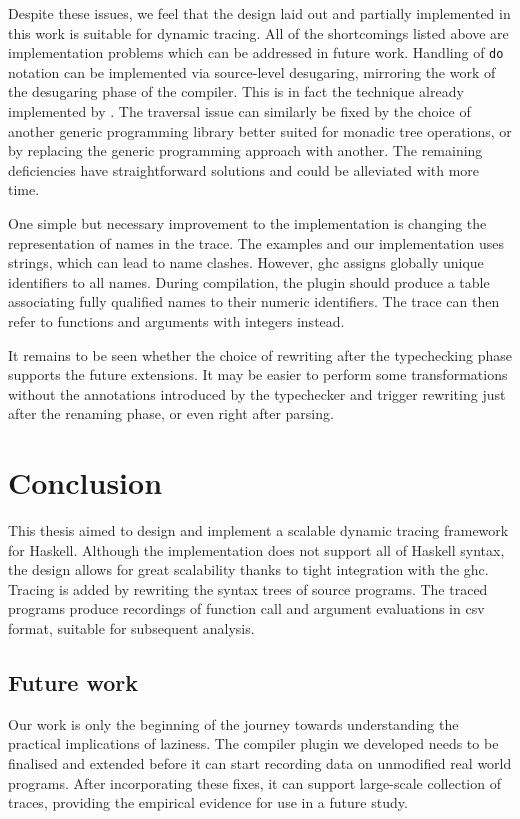 \documentclass[thesis=B,english]{FITthesis}[2019/12/23]
\newcommand{\hsCode}[1]{\texttt{#1}}
\begin{document}
Despite these issues, we feel that the design laid out and partially
implemented in this work is suitable for dynamic tracing. All of the
shortcomings listed above are implementation problems which can be addressed in
future work. Handling of \hsCode{do} notation can be implemented via
source-level desugaring, mirroring the work of the desugaring phase of the
compiler. This is in fact the technique already implemented by
. The traversal issue can similarly be fixed by the choice of
another generic programming library better suited for monadic tree operations,
or by replacing the generic programming approach with another. The remaining
deficiencies have straightforward solutions and could be alleviated with more
time.

One simple but necessary improvement to the implementation is changing the
representation of names in the trace. The examples and our implementation uses
strings, which can lead to name clashes. However, \acrshort{ghc} assigns
globally unique identifiers to all names. During compilation, the plugin should
produce a table associating fully qualified names to their numeric identifiers.
The trace can then refer to functions and arguments with integers instead.

It remains to be seen whether the choice of rewriting after the typechecking
phase supports the future extensions. It may be easier to perform some
transformations without the annotations introduced by the typechecker and
trigger rewriting just after the renaming phase, or even right after parsing.


\chapter{Conclusion}

This thesis aimed to design and implement a scalable dynamic tracing framework
for Haskell. Although the implementation does not support all of Haskell
syntax, the design allows for great scalability thanks to tight integration
with the \acrlong{ghc}. Tracing is added by rewriting the syntax trees of
source programs. The traced programs produce recordings of function call and
argument evaluations in \acrshort{csv} format, suitable for subsequent
analysis.

\section*{Future work}
Our work is only the beginning of the journey towards understanding the
practical implications of laziness. The compiler plugin we developed needs to
be finalised and extended before it can start recording data on unmodified real
world programs. After incorporating these fixes, it can support large-scale
collection of traces, providing the empirical evidence for use in a future
study.
\end{document}
